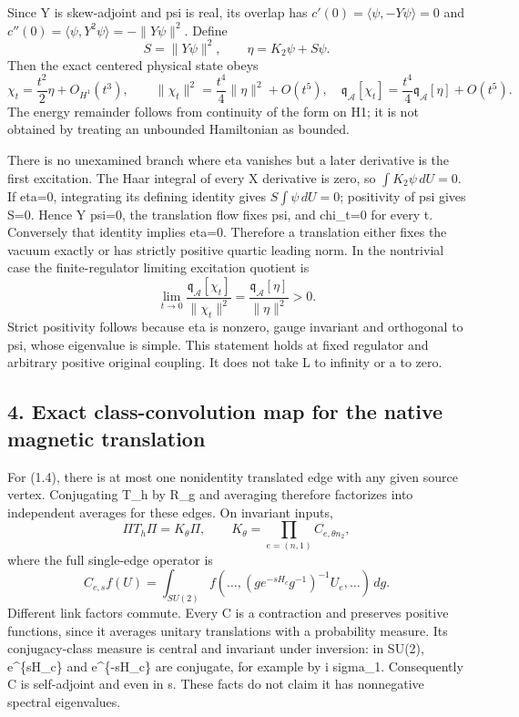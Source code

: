 \documentclass[
  11pt,
]{article}
\begin{document}
Since Y is skew-adjoint and psi is real, its overlap has
\(c'(0)=\langle\psi,-Y\psi\rangle=0\) and
\(c''(0)=\langle\psi,Y^2\psi\rangle=-\|Y\psi\|^2\). Define \[
 S=\|Y\psi\|^2,\qquad \eta=K_2\psi+S\psi.
\] Then the exact centered physical state obeys \[
 \chi_t=\frac{t^2}{2}\eta+O_{H^1}(t^3),\qquad
 \|\chi_t\|^2=\frac{t^4}{4}\|\eta\|^2+O(t^5),
\quad
 \mathfrak q_{\mathcal A}[\chi_t]
 =\frac{t^4}{4}\mathfrak q_{\mathcal A}[\eta]+O(t^5).
\tag{3.3}
\] The energy remainder follows from continuity of the form on H1; it is
not obtained by treating an unbounded Hamiltonian as bounded.

There is no unexamined branch where eta vanishes but a later derivative
is the first excitation. The Haar integral of every X derivative is
zero, so \(\int K_2\psi\,dU=0\). If eta=0, integrating its defining
identity gives \(S\int\psi\,dU=0\); positivity of psi gives S=0. Hence Y
psi=0, the translation flow fixes psi, and chi\_t=0 for every t.
Conversely that identity implies eta=0. Therefore a translation either
fixes the vacuum exactly or has strictly positive quartic leading norm.
In the nontrivial case the finite-regulator limiting excitation quotient
is \[
 \lim_{t\to0}\frac{\mathfrak q_{\mathcal A}[\chi_t]}{\|\chi_t\|^2}
 =\frac{\mathfrak q_{\mathcal A}[\eta]}{\|\eta\|^2}>0.
\tag{3.4}
\] Strict positivity follows because eta is nonzero, gauge invariant and
orthogonal to psi, whose eigenvalue is simple. This statement holds at
fixed regulator and arbitrary positive original coupling. It does not
take L to infinity or a to zero.

\subsection{4. Exact class-convolution map for the native magnetic
translation}\label{magnetic-part-1-exact-class-convolution-map-for-the-native-magnetic-translation}

For (1.4), there is at most one nonidentity translated edge with any
given source vertex. Conjugating T\_h by R\_g and averaging therefore
factorizes into independent averages for these edges. On invariant
inputs, \[
 \Pi T_h\Pi=K_\theta\Pi,\qquad
 K_\theta=\prod_{e=(n,1)}C_{e,\theta n_2},
\tag{4.1}
\] where the full single-edge operator is \[
 C_{e,s}f(U)=\int_{SU(2)}
 f(\ldots,(g e^{-sH_c}g^{-1})^{-1}U_e,\ldots)\,dg.
\tag{4.2}
\] Different link factors commute. Every C is a contraction and
preserves positive functions, since it averages unitary translations
with a probability measure. Its conjugacy-class measure is central and
invariant under inversion: in SU(2), e\^{}\{sH\_c\} and e\^{}\{-sH\_c\}
are conjugate, for example by i sigma\_1. Consequently C is self-adjoint
and even in s. These facts do not claim it has nonnegative spectral
eigenvalues.
\end{document}
